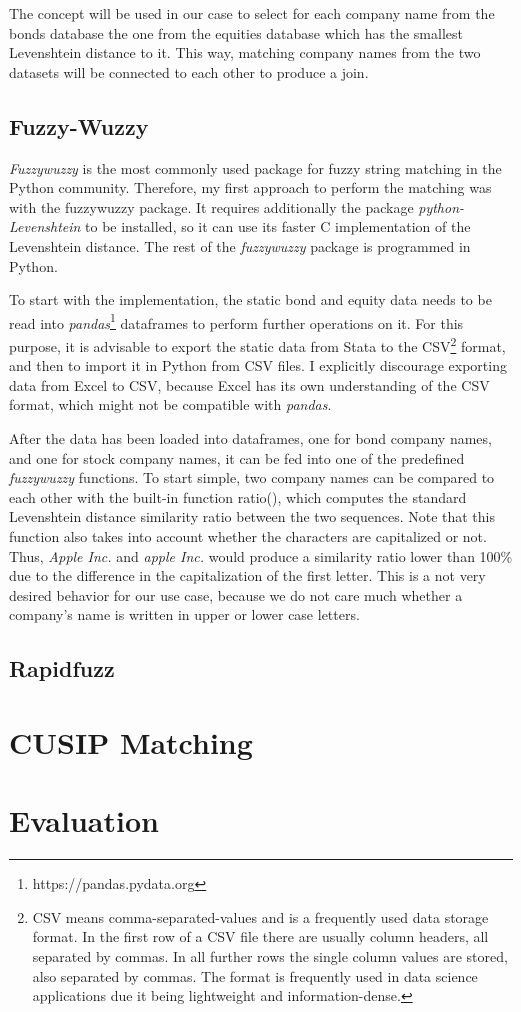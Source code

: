 The concept will be used in our case to select for each company name from the bonds database the one from the equities database which has the smallest Levenshtein distance to it. This way, matching company names from the two datasets will be connected to each other to produce a join. 

\subsection{Fuzzy-Wuzzy}
\textit{Fuzzywuzzy} is the most commonly used package for fuzzy string matching in the Python community. Therefore, my first approach to perform the matching was with the fuzzywuzzy package. It requires additionally the package \textit{python-Levenshtein} to be installed, so it can use its faster C implementation of the Levenshtein distance. The rest of the \textit{fuzzywuzzy} package is programmed in Python. 

To start with the implementation, the static bond and equity data needs to be read into \textit{pandas}\footnote{https://pandas.pydata.org} dataframes to perform further operations on it. For this purpose, it is advisable to export the static data from Stata to the CSV\footnote{CSV means comma-separated-values and is a frequently used data storage format. In the first row of a CSV file there are usually column headers, all separated by commas. In all further rows the single column values are stored, also separated by commas. The format is frequently used in data science applications due it being lightweight and information-dense. } format, and then to import it in Python from CSV files. I explicitly discourage exporting data from Excel to CSV, because Excel has its own understanding of the CSV format, which might not be compatible with \textit{pandas}. 

After the data has been loaded into dataframes, one for bond company names, and one for stock company names, it can be fed into one of the predefined \textit{fuzzywuzzy} functions. To start simple, two company names can be compared to each other with the built-in function ratio(), which computes the standard Levenshtein distance similarity ratio between the two sequences. Note that this function also takes into account whether the characters are capitalized or not. Thus, \textit{Apple Inc. }and \textit{apple Inc.} would produce a similarity ratio lower than 100\% due to the difference in the capitalization of the first letter. This is a not very desired behavior for our use case, because we do not care much whether a company's name is written in upper or lower case letters. 

\subsection{Rapidfuzz}


\section{CUSIP Matching} \label{section:cusip-matching}

\section{Evaluation} \label{section:matching-evaluation}



